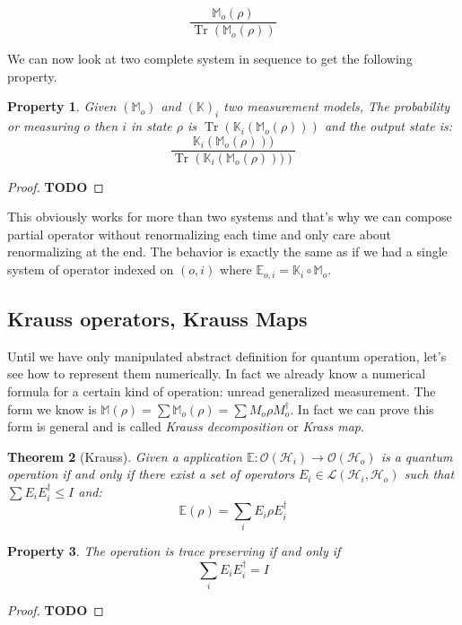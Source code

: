 \documentclass[10pt]{report}
\theoremstyle{plain}
\newtheorem{thm}{Theorem}[chapter]
\newtheorem{prop}[thm]{Property}
\theoremstyle{definition}
\theoremstyle{remark}
\newcommand{\TODO}{\textbf{TODO}}
\DeclareMathOperator{\Tr}{Tr}
\newcommand{\trnorm}[1]{\frac{#1}{\Tr\left({#1}\right)}}
\begin{document}
\[\trnorm{\mathbb M_o(\rho)}\]

We can now look at two complete system in sequence to get the following
property.

\begin{prop}\label{prop:qocomp}
  Given $(\mathbb M_o)$ and $(\mathbb K)_i$ two measurement models, The
  probability or measuring $o$ then $i$ in state $\rho$
  is $\Tr(\mathbb K_i (\mathbb M_o(\rho)))$ and the output state is:
  \[\trnorm{\mathbb K_i (\mathbb M_o(\rho)))}\]
\end{prop}

\begin{proof}
  \TODO{}
\end{proof}

This obviously works for more than two systems and that's why we can compose
partial operator without renormalizing each time and only care about
renormalizing at the end. The behavior is exactly the same as if we had a single
system of operator indexed on $(o,i)$ where $\mathbb E_{o,i} = \mathbb K_i \circ
\mathbb M_o$.

\subsection{Krauss operators, Krauss Maps}\label{ssec:kraus}

Until we have only manipulated abstract definition for quantum operation, let's
see how to represent them numerically. In fact we already know a numerical
formula for a certain kind of operation: unread generalized measurement. The
form we know is $\mathbb{M}(\rho) = \sum \mathbb M_o(\rho) = \sum M_o\rho
M_o^\dagger$. In fact we can prove this form is general and is called
\emph{Krauss decomposition} or \emph{Krass map}.

\begin{thm}[Krauss]
  Given a application $\mathbb E : \mathcal{O}(\mathcal{H}_i) \to
  \mathcal{O}(\mathcal{H}_o)$ is a quantum operation if and only if there exist
  a set of operators $E_i \in \mathcal{L}(\mathcal{H}_i, \mathcal{H}_o)$ such
  that $\sum E_i E_i^\dagger \le I$ and:
  \[\mathbb E(\rho) = \sum_i E_i\rho E_i^\dagger\]
\end{thm}

\begin{prop}
  The operation is trace preserving if and only if
\[\sum_i E_i E_i^\dagger = I\]
\end{prop}

\begin{proof}
  \TODO{}
\end{proof}
\end{document}
